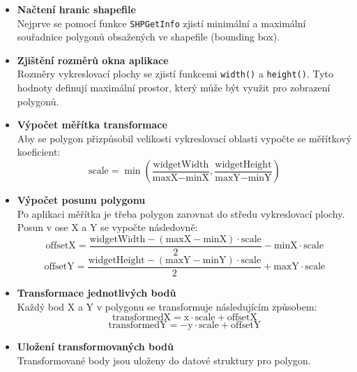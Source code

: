 \begin{itemize}
    \item \textbf{Načtení hranic shapefile} \\
    Nejprve se pomocí funkce \texttt{SHPGetInfo} zjistí minimální a maximální souřadnice polygonů obsažených ve shapefile (bounding box).

    \item \textbf{Zjištění rozměrů okna aplikace} \\
    Rozměry vykreslovací plochy se zjistí funkcemi \texttt{width()} a \texttt{height()}. Tyto hodnoty definují maximální prostor, který může být využit pro zobrazení polygonů.

    \item \textbf{Výpočet měřítka transformace} \\
    Aby se polygon přizpůsobil velikosti vykreslovací oblasti vypočte se měřítkový koeficient:
    \begin{equation}
        \text{scale} = \min \left( \frac{\text{widgetWidth}}{\text{maxX} - \text{minX}}, \frac{\text{widgetHeight}}{\text{maxY} - \text{minY}} \right)
    \end{equation}

    \item \textbf{Výpočet posunu polygonu} \\
    Po aplikaci měřítka je třeba polygon zarovnat do středu vykreslovací plochy. Posun v ose X a Y se vypočte následovně:
    \begin{equation}
        \text{offsetX} = \frac{\text{widgetWidth} - (\text{maxX} - \text{minX}) \cdot \text{scale}}{2} - \text{minX} \cdot \text{scale}
    \end{equation}
    \begin{equation}
        \text{offsetY} = \frac{\text{widgetHeight} - (\text{maxY} - \text{minY}) \cdot \text{scale}}{2} + \text{maxY} \cdot \text{scale}
    \end{equation}

    \item \textbf{Transformace jednotlivých bodů} \\
    Každý bod X a Y v polygonu se transformuje následujícím způsobem:
    \begin{equation}
        \text{transformedX} = \text{x} \cdot \text{scale} + \text{offsetX}
    \end{equation}
    \begin{equation}
        \text{transformedY} = -\text{y} \cdot \text{scale} + \text{offsetY}
    \end{equation}
    
    \item \textbf{Uložení transformovaných bodů} \\
    Transformované body jsou uloženy do datové struktury pro polygon.
\end{itemize}